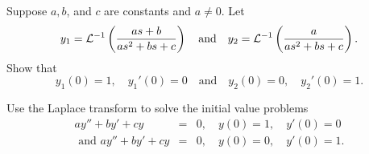 \documentclass{ximera}
\begin{document}
\begin{problem}\label{exer:8.3.38}
Suppose $a,b$, and $c$ are constants and $a\ne0$.  Let
$$
y_1={\cal L}^{-1}\left(\frac{as+b}{as^2+bs+c}\right)\quad\mbox{and}\quad
y_2={\cal L}^{-1}\left(\frac{a}{as^2+bs+c}\right).
$$
Show that
$$
y_1(0)=1,\quad y_1'(0)=0\quad\mbox{and}\quad y_2(0)=0,\quad y_2'(0)=1.
$$
\begin{hint}
Use the Laplace transform to solve the initial value
problems
\begin{eqnarray*}
ay''+by'+cy&=&0, \quad   y(0)=1,\quad y'(0)=0 \\

\text{ and }

ay''+by'+cy&=&0, \quad  y(0)=0,\quad y'(0)=1.
\end{eqnarray*}
\end{hint}
\end{problem}
\end{document}
